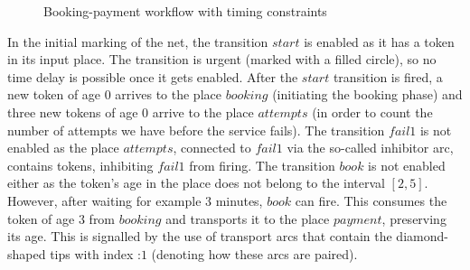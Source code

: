 \begin{figure}[t]
\caption{Booking-payment workflow with timing constraints}
\label{fig:example}
\end{figure}

In the initial marking of the net, the transition $\mathit{start}$
is enabled as it has a token %
in its input place.
The transition is urgent (marked with a filled circle), so no time
delay is possible once it gets enabled.
After the $\mathit{start}$ transition is fired, a new token of age 
$0$ arrives to the place $\mathit{booking}$ (initiating the booking phase) 
and three new tokens of age $0$ arrive to the place $\mathit{attempts}$
(in order to count the number of attempts we have before the service fails).
The transition $\mathit{fail1}$ is not enabled as 
the place $\mathit{attempts}$, connected to $\mathit{fail1}$
via the so-called inhibitor arc, contains tokens, inhibiting
$\mathit{fail1}$ from firing. The transition $\mathit{book}$ is not enabled
either as the token's age in the place  
does not belong to the interval $[2,5]$.
However, after waiting for example $3$ minutes, $\mathit{book}$ %
can fire.  This consumes the token of age $3$ from $\mathit{booking}$ and 
transports it to the place $\mathit{payment}$, preserving its age. This
is signalled by the use of transport arcs that contain the diamond-shaped
tips with index :$1$ (denoting how these arcs are paired). 


